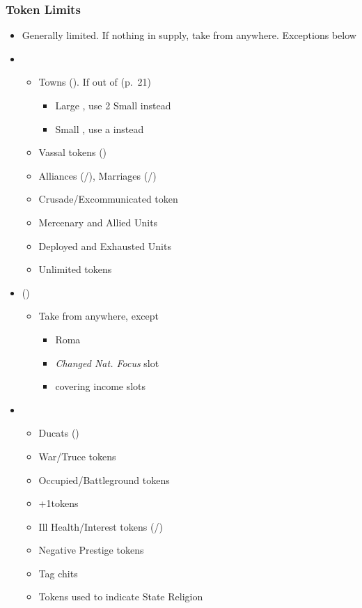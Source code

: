 \documentclass[10pt]{article}
\begin{document}
\subsubsection*{Token Limits }
\begin{itemize}
	\item Generally limited. If nothing in supply, take from anywhere. Exceptions below
	\item {}
	\begin{itemize}
		\item Towns (\town). If out of (p.~21)
		\begin{itemize}
			\item Large \towns, use 2 Small \towns instead
			\item Small \towns, use a \vassal instead
		\end{itemize}
		\item Vassal tokens (\vassal)
		\item Alliances (\alliance/\activeally), Marriages (\marriage/\disputedsuccession)
		\item Crusade/Excommunicated token
		\item Mercenary and Allied Units
		\item	Deployed and Exhausted Units
		\item \dprime Unlimited\dprime\xspace tokens
	\end{itemize}
	\item {} (\cube)
	\begin{itemize}
		\item Take from anywhere, except
		\begin{itemize}
			\item Roma \cardinal
			\item \emph{Changed Nat. Focus} slot
			\item \cubes covering income slots
		\end{itemize}
	\end{itemize}
	\item {}
	\begin{itemize}
		\item Ducats (\ducats)
		\item War/Truce tokens
		\item Occupied/Battleground tokens
		\item +1\manpower tokens
		\item Ill Health/Interest tokens (\illhealth/\interest)
		\item Negative Prestige tokens
		\item Tag chits
		\item Tokens used to indicate State Religion
	\end{itemize}
\end{itemize}
\end{document}
